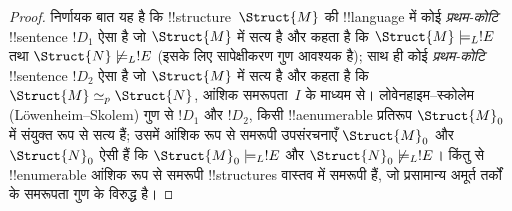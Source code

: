 \documentclass[../../../include/open-logic-section]{subfiles}
\begin{document}
\begin{proof}
निर्णायक बात यह है कि !!{structure}~$\Struct{M}$ की !!{language} में कोई
\emph{प्रथम-कोटि} !!{sentence} $!D_1$ ऐसा है जो $\Struct{M}$ में सत्य है
और कहता है कि $\Struct{M} \models_L !E$ तथा $\Struct{N} \not\models_L !E$ (इसके लिए सापेक्षीकरण गुण आवश्यक है); साथ ही कोई \emph{प्रथम-कोटि}
!!{sentence} $!D_2$ ऐसा है जो $\Struct{M}$ में सत्य है और कहता है कि
$\Struct{M} \simeq_p \Struct{N}$, आंशिक समरूपता~$I$ के माध्यम से।
लोवेनहाइम--स्कोलेम (L\"owenheim--Skolem) गुण से $!D_1$ और $!D_2$, किसी !!a{enumerable} प्रतिरूप
$\Struct{M}_0$ में संयुक्त रूप से सत्य हैं; उसमें आंशिक रूप से समरूपी
उपसंरचनाएँ $\Struct{M}_0$ और $\Struct{N}_0$ ऐसी हैं कि $\Struct{M}_0 \models_L !E$ और $\Struct{N}_0
\not\models_L !E$। किंतु
 से !!{enumerable} आंशिक रूप से समरूपी
!!{structure}s वास्तव में समरूपी हैं, जो प्रसामान्य अमूर्त तर्कों के
समरूपता गुण के विरुद्ध है।
\end{proof}
\end{document}
